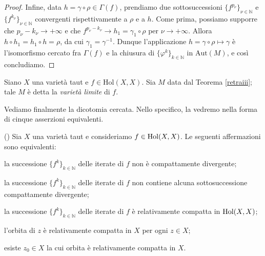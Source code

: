 \begin{proof}
    Infine, data $h=\gamma\circ\rho\in\Gamma(f)$, prendiamo due sottosuccessioni $\{f^{p_\nu}\}_{\nu\in\mathbb{N}}$ e $\{f^{k_\nu}\}_{\nu\in\mathbb{N}}$ convergenti rispettivamente a $\rho$ e a $h$. Come prima, possiamo supporre che $p_\nu-k_\nu \longrightarrow+\infty$ e che $f^{p_\nu-k_\nu} \longrightarrow h_1=\gamma_1\circ\rho$ per $\nu\longrightarrow+\infty$. Allora $h\circ h_1=h_1\circ h=\rho$, da cui $\gamma_1=\gamma^{-1}$. Dunque l'applicazione $h=\gamma\circ\rho\longmapsto\gamma$ è l'isomorfismo cercato fra $\Gamma(f)$ e la chiusura di $\{\varphi^k\}_{k\in\mathbb{N}}$ in $\text{Aut}(M)$, e così concludiamo.
\end{proof}

\begin{defn}
    Siano $X$ una varietà taut e $f\in\text{Hol}(X,X)$. Sia $M$ data dal Teorema \ref{retraiii}; tale $M$ è detta la \textit{varietà limite} di $f$.
\end{defn}

Vediamo finalmente la dicotomia cercata. Nello specifico, la vedremo nella forma di cinque asserzioni equivalenti.

\begin{thm} \label{dicotomia}
    (\cite[Theorem 1.1]{A2}) Sia $X$ una varietà taut e consideriamo $f \in \textnormal{Hol}(X,X)$. Le seguenti affermazioni sono equivalenti:
    \begin{nlist}
        \item la successione $\{f^k\}_{k \in \mathbb{N}}$ delle iterate di $f$ non è compattamente divergente;
        \item la successione $\{f^k\}_{k \in \mathbb{N}}$ delle iterate di $f$ non contiene alcuna sottosuccessione compattamente divergente;
        \item la successione $\{f^k\}_{k \in \mathbb{N}}$ delle iterate di $f$ è relativamente compatta in $\textnormal{Hol}(X,X)$;
        \item l'orbita di $z$ è relativamente compatta in $X$ per ogni $z \in X$;
        \item esiste $z_0 \in X$ la cui orbita è relativamente compatta in $X$.
    \end{nlist}
\end{thm}

